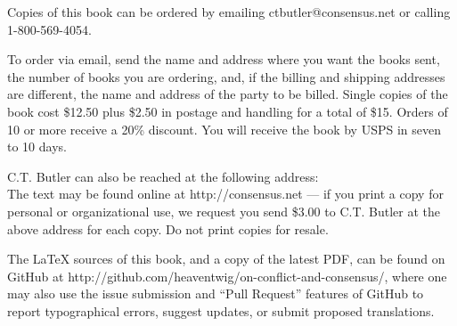 
Copies of this book can be ordered by emailing ctbutler@consensus.net or
calling 1-800-569-4054.

To order via email, send the name and address where you want the
books sent, the number of books you are ordering, and, if the
billing and shipping addresses are different, the name and address
of the party to be billed.  Single copies of the book cost \$12.50
plus \$2.50 in postage and handling for a total of \$15. Orders of
10 or more receive a 20\% discount.  You will receive the book by
USPS in seven to 10 days.

C.T. Butler can also be reached at the following address:\\


The text may be found online at http://consensus.net --- if you print a copy for personal or organizational use, we request you send \$3.00 to C.T. Butler at the above address for each copy.  Do not print copies for resale.

The \LaTeX{} sources of this book, and a copy of the latest PDF, can be found on GitHub at http://github.com/heaventwig/on-conflict-and-consensus/, where one may also use the issue submission and ``Pull Request'' features of GitHub to report typographical errors, suggest updates, or submit proposed translations.

